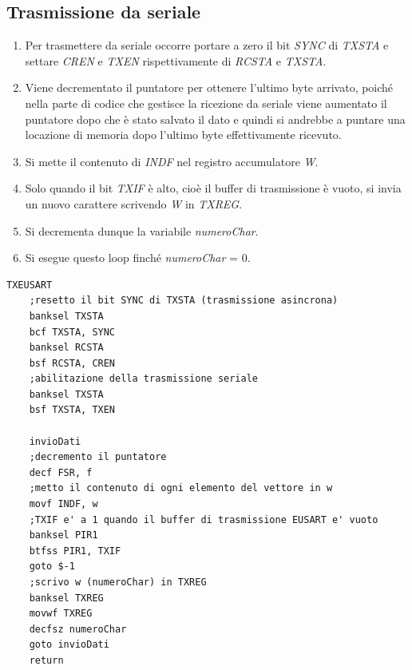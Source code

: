\documentclass{article}
\begin{document}
	\subsection{Trasmissione da seriale}
	\begin{enumerate}
		\item Per trasmettere da seriale occorre portare a zero il bit \emph{SYNC} di \emph{TXSTA} e settare \emph{CREN} e \emph{TXEN} rispettivamente di \emph{RCSTA} e \emph{TXSTA}. 
		\item Viene decrementato il puntatore per ottenere l'ultimo byte arrivato, poiché nella parte di codice che gestisce la ricezione da seriale viene aumentato il puntatore dopo che è stato salvato il dato e quindi si andrebbe a puntare una locazione di memoria dopo l'ultimo byte effettivamente ricevuto. 
		\item Si mette il contenuto di \emph{INDF} nel registro accumulatore \emph{W}. 
		\item Solo quando il bit \emph{TXIF} è alto, cioè il buffer di trasmissione è vuoto, si invia un nuovo carattere scrivendo \emph{W} in \emph{TXREG}. 
		\item Si decrementa dunque la variabile \emph{numeroChar}.
		\item Si esegue questo loop finché \emph{numeroChar} = 0.
	\end{enumerate}
	\begin{lstlisting}[frame=single]
TXEUSART	
	;resetto il bit SYNC di TXSTA (trasmissione asincrona)
	banksel TXSTA
	bcf TXSTA, SYNC
	banksel RCSTA
	bsf RCSTA, CREN
	;abilitazione della trasmissione seriale
	banksel TXSTA
	bsf TXSTA, TXEN		
	
	invioDati	
	;decremento il puntatore
	decf FSR, f
	;metto il contenuto di ogni elemento del vettore in w
	movf INDF, w
	;TXIF e' a 1 quando il buffer di trasmissione EUSART e' vuoto
	banksel PIR1
	btfss PIR1, TXIF
	goto $-1
	;scrivo w (numeroChar) in TXREG
	banksel TXREG
	movwf TXREG
	decfsz numeroChar
	goto invioDati
	return
	\end{lstlisting}
\end{document}

